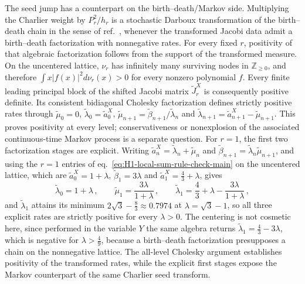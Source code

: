 \documentclass[a4paper,11pt]{article}
\def\dd{d}%
\def\Jac{J}%
\theoremstyle{definition}
\theoremstyle{remark}
\newcommand{\dd}{\mathrm d}
\newcommand{\Jac}{\mathsf J}
\begin{document}
The seed jump has a counterpart on the birth--death/Markov side. Multiplying the Charlier weight by $P_r^2/h_r$ is a stochastic Darboux transformation of the birth--death chain in the sense of ref.~\cite{GrunbaumDeLaIglesia2018}, whenever the transformed Jacobi data admit a birth--death factorization with nonnegative rates. For every fixed $r$, positivity of that algebraic factorization follows from the support of the transformed measure.  On the uncentered lattice, $\nu_r$ has infinitely many surviving nodes in $\mathbb Z_{\ge0}$, and therefore
$\int x|f(x)|^2\dd\nu_r(x)>0$ for every nonzero polynomial $f$.  Every finite leading principal block of the shifted Jacobi matrix $\widetilde{\Jac}_r^X$ is consequently positive definite.  Its consistent bidiagonal Cholesky factorization defines strictly positive rates through
$\widetilde\mu_0=0$, $\widetilde\lambda_0=\widetilde a_0^X$,
$\widetilde\mu_{n+1}=\widetilde\beta_{n+1}/\widetilde\lambda_n$ and
$\widetilde\lambda_{n+1}=\widetilde a_{n+1}^X-\widetilde\mu_{n+1}$.  This proves positivity at every level; conservativeness or nonexplosion of the associated continuous-time Markov process is a separate question.  For $r=1$, the first two factorization stages are explicit. Writing $\widetilde a_n^{X}=\widetilde\lambda_n+\widetilde\mu_n$ and $\widetilde\beta_{n+1}=\widetilde\lambda_n\widetilde\mu_{n+1}$, and using the $r=1$ entries of eq.~\eqref{eq:H1-local-sum-rule-check-main} on the uncentered lattice, which are $\widetilde a_0^{X}=1+\lambda$, $\widetilde\beta_1=3\lambda$ and $\widetilde a_1^{X}=\tfrac43+\lambda$, gives
\begin{equation}
   \widetilde\lambda_0=1+\lambda\,,
   \qquad
   \widetilde\mu_1=\frac{3\lambda}{1+\lambda}\,,
   \qquad
   \widetilde\lambda_1=\frac43+\lambda-\frac{3\lambda}{1+\lambda} \,,
   \label{eq:birth-death-first-jump}
\end{equation}
and $\widetilde\lambda_1$ attains its minimum $2\sqrt3-\tfrac83\approx0.7974$ at $\lambda=\sqrt3-1$, so all three explicit rates are strictly positive for every $\lambda>0$. The centering is not cosmetic here, since performed in the variable $Y$ the same algebra returns $\widetilde\lambda_1=\tfrac43-3\lambda$, which is negative for $\lambda>\tfrac49$, because a birth--death factorization presupposes a chain on the nonnegative lattice. The all-level Cholesky argument establishes positivity of the transformed rates, while the explicit first stages expose the Markov counterpart of the same Charlier seed transform.
\end{document}
